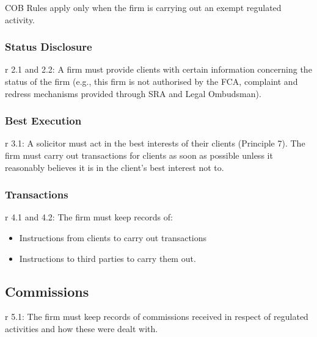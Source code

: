 \documentclass[
]{article}
\newenvironment{Shaded}{}{}
\newcommand{\NormalTok}[1]{#1}
\providecommand{\tightlist}{%
  \setlength{\itemsep}{0pt}\setlength{\parskip}{0pt}}
\begin{document}
\begin{Shaded}
\begin{Highlighting}[]
\NormalTok{COB Rules apply only when the firm is carrying out an exempt regulated activity. }
\end{Highlighting}
\end{Shaded}

\hypertarget{status-disclosure}{%
\subsubsection{Status Disclosure}\label{status-disclosure}}

r 2.1 and 2.2: A firm must provide clients with certain information
concerning the status of the firm (e.g., this firm is not authorised by
the FCA, complaint and redress mechanisms provided through SRA and Legal
Ombudsman).

\hypertarget{best-execution}{%
\subsubsection{Best Execution}\label{best-execution}}

r 3.1: A solicitor must act in the best interests of their clients
(Principle 7). The firm must carry out transactions for clients as soon
as possible unless it reasonably believes it is in the client's best
interest not to.

\hypertarget{transactions}{%
\subsubsection{Transactions}\label{transactions}}

r 4.1 and 4.2: The firm must keep records of:

\begin{itemize}
\tightlist
\item
  Instructions from clients to carry out transactions
\item
  Instructions to third parties to carry them out.
\end{itemize}

\hypertarget{commissions}{%
\subsection{Commissions}\label{commissions}}

r 5.1: The firm must keep records of commissions received in respect of
regulated activities and how these were dealt with.
\end{document}
